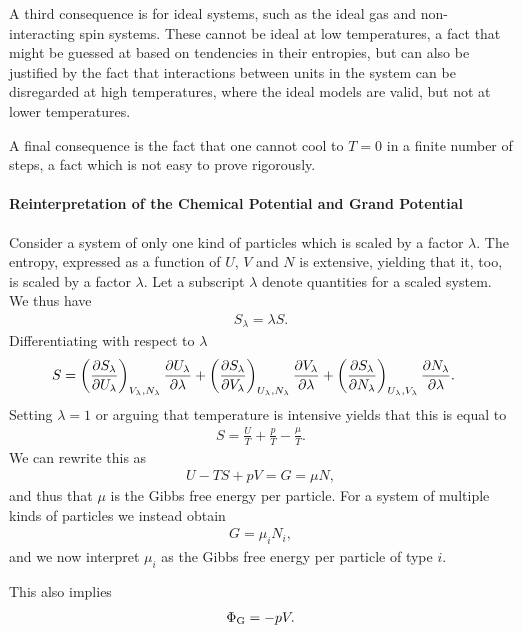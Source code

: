 A third consequence is for ideal systems, such as the ideal gas and non-interacting spin systems. These cannot be ideal at low temperatures, a fact that might be guessed at based on tendencies in their entropies, but can also be justified by the fact that interactions between units in the system can be disregarded at high temperatures, where the ideal models are valid, but not at lower temperatures.

A final consequence is the fact that one cannot cool to $T = 0$ in a finite number of steps, a fact which is not easy to prove rigorously.

\paragraph{Reinterpretation of the Chemical Potential and Grand Potential}
Consider a system of only one kind of particles which is scaled by a factor $\lambda$. The entropy, expressed as a function of $U$, $V$ and $N$ is extensive, yielding that it, too, is scaled by a factor $\lambda$. Let a subscript $\lambda$ denote quantities for a scaled system. We thus have
\begin{align*}
	S_{\lambda} = \lambda S.
\end{align*}
Differentiating with respect to $\lambda$ 
\begin{align*}
	S &= \left(\pdv{S_{\lambda}}{U_{\lambda}}\right)_{V_{\lambda}, N_{\lambda}}\pdv{U_{\lambda}}{\lambda} + \left(\pdv{S_{\lambda}}{V_{\lambda}}\right)_{U_{\lambda}, N_{\lambda}}\pdv{V_{\lambda}}{\lambda} + \left(\pdv{S_{\lambda}}{N_{\lambda}}\right)_{U_{\lambda}, V_{\lambda}}\pdv{N_{\lambda}}{\lambda}.
\end{align*}
Setting $\lambda = 1$ or arguing that temperature is intensive yields that this is equal to
\begin{align*}
	S = \frac{U}{T} + \frac{p}{T} - \frac{\mu}{T}. 
\end{align*}
We can rewrite this as
\begin{align*}
	U - TS + pV = G = \mu N,
\end{align*}
and thus that $\mu$ is the Gibbs free energy per particle. For a system of multiple kinds of particles we instead obtain
\begin{align*}
	G = \mu_{i}N_{i},
\end{align*}
and we now interpret $\mu_{i}$ as the Gibbs free energy per particle of type $i$.

This also implies
\begin{align*}
	\Phi_{\text{G}} = -pV.
\end{align*}

